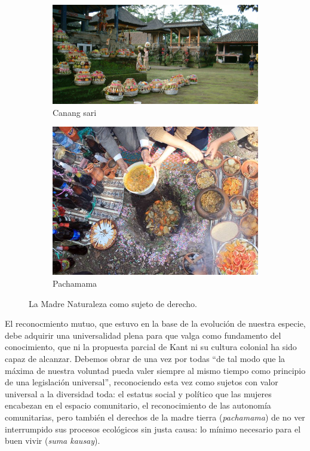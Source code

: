 \documentclass[a4paper,10pt]{book}
\begin{document}
\begin{figure}[ht!]
    \centering
    \begin{subfigure}[b]{0.45\textwidth}
    \centering
    \includegraphics[width=\linewidth]{static/bali-offerings}
    \caption{Canang sari}
    \label{}
    \end{subfigure}
    \begin{subfigure}[b]{0.33\textwidth}
    \centering
    \includegraphics[width=\linewidth]{static/pachamama}
    \caption{Pachamama}
    \label{}
    \end{subfigure}
    \caption{La Madre Naturaleza como sujeto de derecho.}
    \label{fig:mito}
\end{figure}

El reconocmiento mutuo, que estuvo en la base de la evolución de nuestra especie, debe adquirir una universalidad plena para que valga como fundamento del conocimiento, que ni la propuesta parcial de Kant ni su cultura colonial ha sido capaz de alcanzar.
Debemos obrar de una vez por todas ``de tal modo que la máxima de nuestra voluntad pueda valer siempre al mismo tiempo como principio de una legislación universal'', reconociendo esta vez como sujetos con valor universal a la diversidad toda: el estatus social y político que las mujeres encabezan en el espacio comunitario, el reconocimiento de las autonomía comunitarias, pero también el derechos de la madre tierra (\emph{pachamama}) de no ver interrumpido sus procesos ecológicos sin justa causa: lo mínimo necesario para el buen vivir (\emph{suma kausay}).
\end{document}
